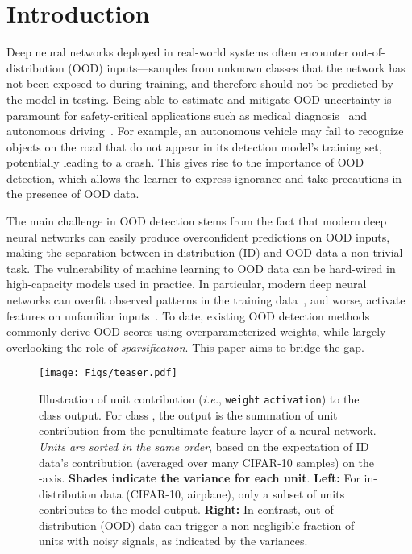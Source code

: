 \documentclass[runningheads]{llncs}
\begin{document}
\section{Introduction}
\label{sec:intro}
Deep neural networks deployed in real-world systems often encounter out-of-distribution (OOD) inputs---samples from unknown classes that the network has not been exposed to during training, and therefore should not be predicted by the model in testing. 
Being able to estimate and mitigate OOD uncertainty is paramount for safety-critical applications such as medical diagnosis~\cite{roy2021does,wang2017chestx} and autonomous driving~\cite{filos2020can}. For example, an autonomous vehicle may fail to recognize objects on the road that do not appear in its detection model’s training set, potentially leading to a crash. This gives rise to the importance of OOD detection, which allows the
learner to express ignorance and take precautions in the presence of OOD data.  

The main challenge in OOD detection stems from the fact that modern deep neural networks can easily produce overconfident predictions on OOD inputs, making the separation between in-distribution (ID) and OOD data a non-trivial task. The vulnerability of machine learning to OOD data can be hard-wired in high-capacity models used in practice. In particular, modern deep neural networks can overfit observed patterns in the training data~\cite{zhang2016understanding}, and worse, {activate features on unfamiliar inputs}~\cite{nguyen2015deep}. 
To date, existing OOD detection methods commonly derive OOD scores using overparameterized weights, while largely overlooking the role of \emph{sparsification}. This paper aims to bridge the gap.


\begin{figure}[t]
	\begin{center}
		\texttt{[image: Figs/teaser.pdf]}
	\end{center}
	\caption{\small Illustration of unit contribution (\emph{i.e.}, \texttt{weight}  \texttt{activation}) to the class output. For class , the output  is the summation of unit contribution from the penultimate feature layer of a neural network. \emph{Units are sorted in the same order}, based on the expectation of ID data's contribution (averaged over many CIFAR-10 samples) on the -axis. \textbf{Shades indicate the variance for each unit}. \textbf{Left:} For in-distribution data (CIFAR-10, airplane), only a subset of units contributes to the model output.  \textbf{Right:} In contrast, out-of-distribution (OOD) data can trigger a non-negligible fraction of units with noisy signals, as indicated by the variances.}
	\label{fig:whytopk}
\end{figure}
\end{document}
